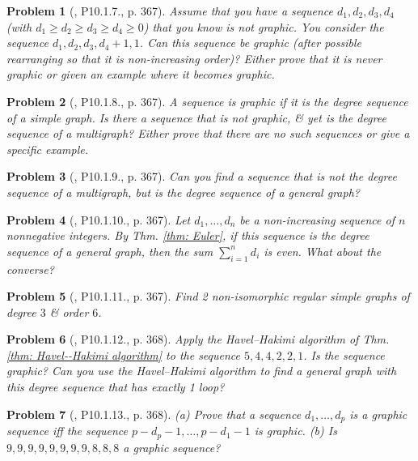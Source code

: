 \documentclass[oneside]{book}
\newtheorem{problem}{Problem}
\begin{document}
\begin{problem}[\cite{Shahriari2022}, P10.1.7., p. 367]
	Assume that you have a sequence $d_1,d_2,d_3,d_4$ (with $d_1\ge d_2\ge d_3\ge d_4\ge0$) that you know is not graphic. You consider the sequence $d_1,d_2,d_3,d_4 + 1,1$. Can this sequence be graphic (after possible rearranging so that it is non-increasing order)? Either prove that it is never graphic or given an example where it becomes graphic.
\end{problem}

\begin{problem}[\cite{Shahriari2022}, P10.1.8., p. 367]
	A sequence is graphic if it is the degree sequence of a {\rm simple} graph. Is there a sequence that is not graphic, \& yet is the degree sequence of a multigraph? Either prove that there are no such sequences or give a specific example.
\end{problem}

\begin{problem}[\cite{Shahriari2022}, P10.1.9., p. 367]
	Can you find a sequence that is {\rm not} the degree sequence of a multigraph, but is the degree sequence of a general graph?
\end{problem}

\begin{problem}[\cite{Shahriari2022}, P10.1.10., p. 367]
	Let $d_1,\ldots,d_n$ be a non-increasing sequence of $n$ nonnegative integers. By Thm. \ref{thm: Euler}, if this sequence is the degree sequence of a general graph, then the sum $\sum_{i=1}^n d_i$ is even. What about the converse?
\end{problem}

\begin{problem}[\cite{Shahriari2022}, P10.1.11., p. 367]
	Find 2 non-isomorphic regular simple graphs of degree $3$ \& order $6$.
\end{problem}

\begin{problem}[\cite{Shahriari2022}, P10.1.12., p. 368]
	Apply the Havel--Hakimi algorithm of Thm. \ref{thm: Havel--Hakimi algorithm} to the sequence $5,4,4,2,2,1$. Is the sequence graphic? Can you use the Havel--Hakimi algorithm to find a general graph with this degree sequence that has exactly 1 loop?
\end{problem}

\begin{problem}[\cite{Shahriari2022}, P10.1.13., p. 368]
	(a) Prove that a sequence $d_1,\ldots,d_p$ is a graphic sequence iff the sequence $p - d_p - 1,\ldots,p - d_1 - 1$ is graphic. (b) Is $9,9,9,9,9,9,9,9,8,8,8$ a graphic sequence?
\end{problem}
\end{document}
